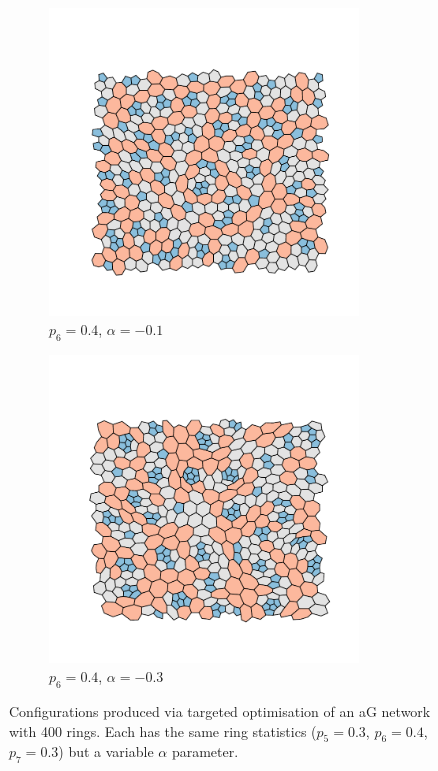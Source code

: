 \begin{figure}[bt]
     \vspace{2mm}
     \begin{subfigure}[b]{0.45\textwidth}
         \centering
         \includegraphics[width=0.9\textwidth]{./figures/targeted_opt/topt_-10.pdf}
         \caption{$p_6=0.4$, $\alpha=-0.1$}
         \label{fig:toptconfigs3}
     \end{subfigure}
     \hfill
     \begin{subfigure}[b]{0.45\textwidth}
         \centering
         \includegraphics[width=0.9\textwidth]{./figures/targeted_opt/topt_-30.pdf}
         \caption{$p_6=0.4$, $\alpha=-0.3$}
         \label{fig:toptconfigs4}
     \end{subfigure}
     \hfill

     \caption{Configurations produced via targeted optimisation of an aG network with 400 rings. Each has the same ring statistics ($p_5=0.3$, $p_6=0.4$, $p_7=0.3$) but a variable $\alpha$ parameter.}
     \label{fig:toptconfigs}
\end{figure}

